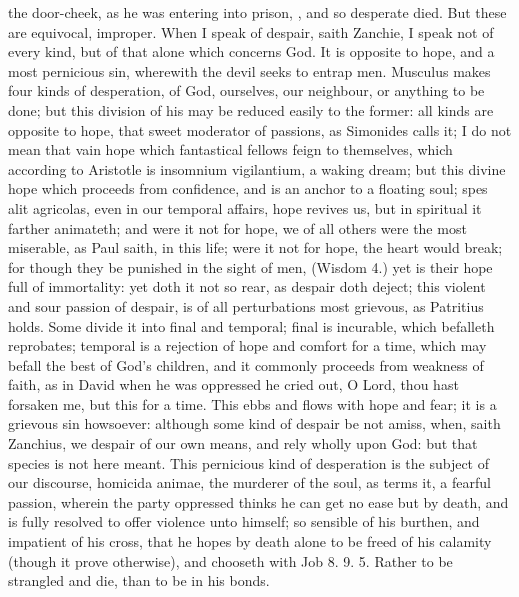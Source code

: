 {the door-cheek, as he was entering into prison, , and so
desperate died. But these are equivocal, improper. When I speak of
despair, saith Zanchie, I speak not of every kind, but of that
alone which concerns God. It is opposite to hope, and a most pernicious
sin, wherewith the devil seeks to entrap men. Musculus makes four kinds
of desperation, of God, ourselves, our neighbour, or anything to be
done; but this division of his may be reduced easily to the former: all
kinds are opposite to hope, that sweet moderator of passions, as
Simonides calls it; I do not mean that vain hope which fantastical
fellows feign to themselves, which according to Aristotle is insomnium
vigilantium, a waking dream; but this divine hope which proceeds from
confidence, and is an anchor to a floating soul; spes alit agricolas,
even in our temporal affairs, hope revives us, but in spiritual it
farther animateth; and were it not for hope, we of all others were the
most miserable, as Paul saith, in this life; were it not for hope, the
heart would break; for though they be punished in the sight of men,
(Wisdom  4.) yet is their hope full of immortality: yet doth it not
so rear, as despair doth deject; this violent and sour passion of
despair, is of all perturbations most grievous, as Patritius
holds. Some divide it into final and temporal; final is
incurable, which befalleth reprobates; temporal is a rejection of hope
and comfort for a time, which may befall the best of God's children,
and it commonly proceeds from weakness of faith, as in David when
he was oppressed he cried out, O Lord, thou hast forsaken me, but this
for a time. This ebbs and flows with hope and fear; it is a grievous
sin howsoever: although some kind of despair be not amiss, when, saith
Zanchius, we despair of our own means, and rely wholly upon God: but
that species is not here meant. This pernicious kind of desperation is
the subject of our discourse, homicida animae, the murderer of the
soul, as \Austin{} terms it, a fearful passion, wherein the party
oppressed thinks he can get no ease but by death, and is fully resolved
to offer violence unto himself; so sensible of his burthen, and
impatient of his cross, that he hopes by death alone to be freed of his
calamity (though it prove otherwise), and chooseth with Job  8. 9.
 5. Rather to be strangled and die, than to be in his bonds.

}
